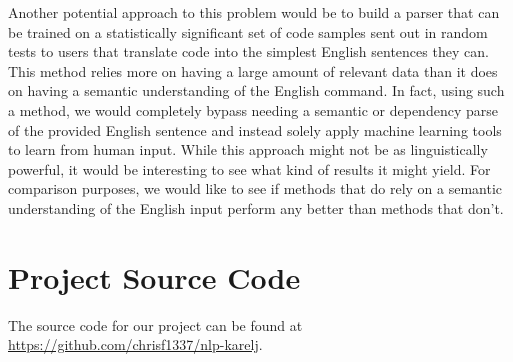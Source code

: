 \documentclass[11pt]{article}
\begin{document}
Another potential approach to this problem would be to build a parser that can be trained on a
statistically significant set of code samples sent out in random tests to users that translate code
into the simplest English sentences they can.  This method relies more on having a large amount of
relevant data than it does on having a semantic understanding of the English command.  In fact,
using such a method, we would completely bypass needing a semantic or dependency parse of the
provided English sentence and instead solely apply machine learning tools to learn from human
input.  While this approach might not be as linguistically powerful, it would be interesting to see
what kind of results it might yield.  For comparison purposes, we would like to see if methods that
do rely on a semantic understanding of the English input perform any better than methods that
don't.

%
%



\appendix

\section{Project Source Code}
The source code for our project can be found at \url{https://github.com/chrisf1337/nlp-karelj}.
\end{document}
